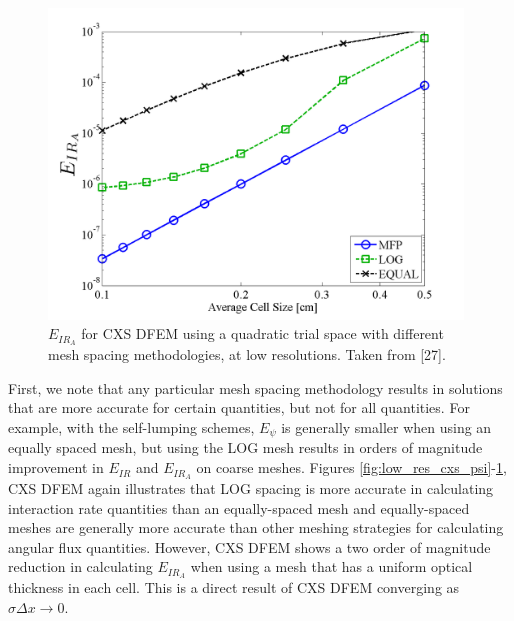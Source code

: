 \begin{figure}[!htp]
\centering
\includegraphics[width=11cm]{chapter3_variable_xs/LOW_RES_P2_CXS_E_IR_A.png}
\caption{$E_{IR_A}$ for CXS DFEM using a quadratic trial space  with different mesh spacing methodologies, at low resolutions.  Taken from [27].}
\label{fig:low_res_cxs_ir_A}
\end{figure}
First, we note that any particular mesh spacing methodology results in solutions that are more accurate for certain quantities, but not for all quantities.  
For example, with the self-lumping schemes, $E_{\psi}$ is generally smaller when using an equally spaced mesh, but using the LOG mesh results in orders of magnitude improvement in $E_{IR}$ and $E_{IR_A}$ on coarse meshes.
Figures \ref{fig:low_res_cxs_psi}-\ref{fig:low_res_cxs_ir_A}, CXS DFEM again illustrates that LOG spacing is more accurate in calculating interaction rate quantities than an equally-spaced mesh and equally-spaced meshes are generally more accurate than other meshing strategies for calculating angular flux quantities.
However, CXS DFEM shows a two order of magnitude reduction in calculating $E_{IR_A}$ when using a mesh that has a uniform optical thickness in each cell.  This is a direct result of CXS DFEM converging as $\hat{\sigma} \Delta x \to 0$.
\vfill{}

%
%

